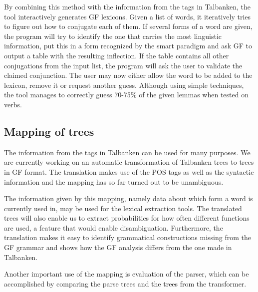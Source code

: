 \documentclass[submission]{eptcs} %
\begin{document}
By combining this method with the information from the tags in Talbanken,
the tool interactively generates GF lexicons. 
Given a list of words, it iteratively
tries to figure out how to conjugate each of them. If several forms of a word are 
given, the program will try to identify the one that carries the most linguistic
information, put this in a form recognized by the smart paradigm and ask GF to output
a table with the resulting inflection. 
If the table contains all other conjugations from the input list,
the program will ask the  user to
validate the claimed conjunction. The user may now either
allow the word to be added to the lexicon, remove it or request another guess.
Although using simple techniques, the tool 
manages to correctly guess 70-75\% of the given lemmas when tested on
verbs.\\



\subsection{Mapping of trees}
The information from the tags in Talbanken can be used for many purposes.
We are currently working on an automatic transformation of Talbanken trees 
to trees in GF format. The translation makes use of the POS tags as well as
the syntactic information and the mapping has so far turned out to be unambiguous. 

The information given by this mapping, namely data about which form a word is
currently used in, may be used for the lexical extraction
tools.%
The translated trees will also enable us to extract probabilities for how often
different functions are used, a feature that would enable disambiguation.
Furthermore, the translation makes it easy to identify grammatical constructions
missing from the GF grammar and shows how the GF analysis differs from the one made
in Talbanken.

Another important use of the mapping is evaluation of the parser, which can be
accomplished by comparing the parse trees and the trees from the transformer.

\end{document}
